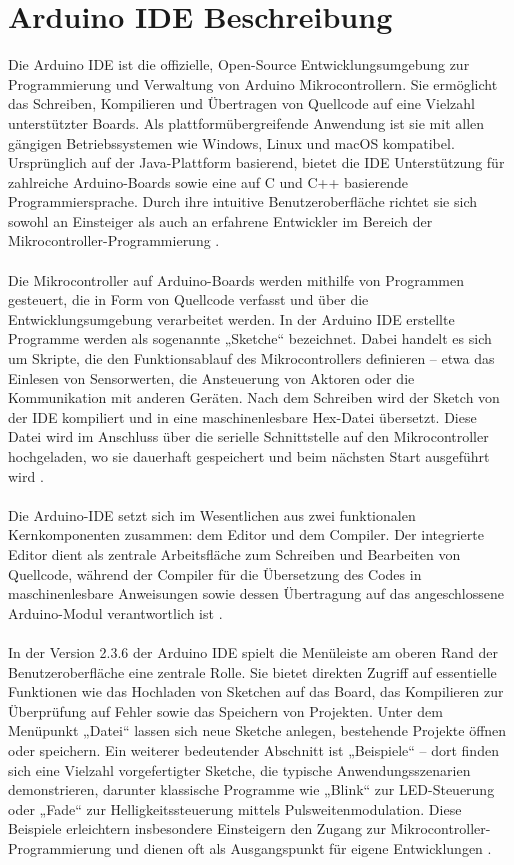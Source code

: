 \section{Arduino IDE Beschreibung } 
Die Arduino IDE ist die offizielle, Open-Source Entwicklungsumgebung zur Programmierung und Verwaltung von Arduino Mikrocontrollern. Sie ermöglicht das Schreiben, Kompilieren und Übertragen von Quellcode auf eine Vielzahl unterstützter Boards. Als plattformübergreifende Anwendung ist sie mit allen gängigen Betriebssystemen wie Windows, Linux und macOS kompatibel. Ursprünglich auf der Java-Plattform basierend, bietet die IDE Unterstützung für zahlreiche Arduino-Boards sowie eine auf C und C++ basierende Programmiersprache. Durch ihre intuitive Benutzeroberfläche richtet sie sich sowohl an Einsteiger als auch an erfahrene Entwickler im Bereich der Mikrocontroller-Programmierung \cite{Fezari:2018}.
\\\\ 
Die Mikrocontroller auf Arduino-Boards werden mithilfe von Programmen gesteuert, die in Form von Quellcode verfasst und über die Entwicklungsumgebung verarbeitet werden. In der Arduino IDE erstellte Programme werden als sogenannte „Sketche“ bezeichnet. Dabei handelt es sich um Skripte, die den Funktionsablauf des Mikrocontrollers definieren – etwa das Einlesen von Sensorwerten, die Ansteuerung von Aktoren oder die Kommunikation mit anderen Geräten. Nach dem Schreiben wird der Sketch von der IDE kompiliert und in eine maschinenlesbare Hex-Datei übersetzt. Diese Datei wird im Anschluss über die serielle Schnittstelle auf den Mikrocontroller hochgeladen, wo sie dauerhaft gespeichert und beim nächsten Start ausgeführt wird \cite{Fezari:2018}.
\\\\ 
Die Arduino-IDE setzt sich im Wesentlichen aus zwei funktionalen Kernkomponenten zusammen: dem Editor und dem Compiler. Der integrierte Editor dient als zentrale Arbeitsfläche zum Schreiben und Bearbeiten von Quellcode, während der Compiler für die Übersetzung des Codes in maschinenlesbare Anweisungen sowie dessen Übertragung auf das angeschlossene Arduino-Modul verantwortlich ist \cite{Fezari:2018}.
\\\\ 
In der Version 2.3.6 der Arduino IDE spielt die Menüleiste am oberen Rand der Benutzeroberfläche eine zentrale Rolle. Sie bietet direkten Zugriff auf essentielle Funktionen wie das Hochladen von Sketchen auf das Board, das Kompilieren zur Überprüfung auf Fehler sowie das Speichern von Projekten. Unter dem Menüpunkt „Datei“ lassen sich neue Sketche anlegen, bestehende Projekte öffnen oder speichern. Ein weiterer bedeutender Abschnitt ist „Beispiele“ – dort finden sich eine Vielzahl vorgefertigter Sketche, die typische Anwendungsszenarien demonstrieren, darunter klassische Programme wie „Blink“ zur LED-Steuerung oder „Fade“ zur Helligkeitssteuerung mittels Pulsweitenmodulation. Diese Beispiele erleichtern insbesondere Einsteigern den Zugang zur Mikrocontroller-Programmierung und dienen oft als Ausgangspunkt für eigene Entwicklungen \cite{Fezari:2018}. 

